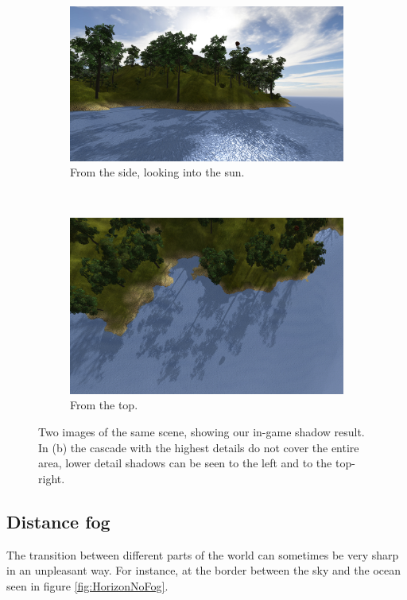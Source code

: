 \begin{figure}[H]
\begin{subfigure}{.9\textwidth}
  \centering
  \includegraphics[width=0.9\linewidth]{images/shadows1.jpg}
  \caption{From the side, looking into the sun.}
  \label{fig:shadows1}
\end{subfigure}%
\\
\begin{subfigure}{.9\textwidth}
  \centering
  \includegraphics[width=0.9\linewidth]{images/shadows2.jpg}
  \caption{From the top.}
  \label{fig:shadows2}
\end{subfigure}
\caption[In-Game shadows.]{Two images of the same scene, showing our in-game shadow result. In (b) the cascade with the highest details do not cover the entire area, lower detail shadows can be seen to the left and to the top-right.}
\label{fig:InGameShadowResult}
\end{figure}

\newpage
\subsection{Distance fog}
The transition between different parts of the world can sometimes be very sharp in an unpleasant way. For instance, at the border between the sky and the ocean seen in figure \ref{fig:HorizonNoFog}. 

